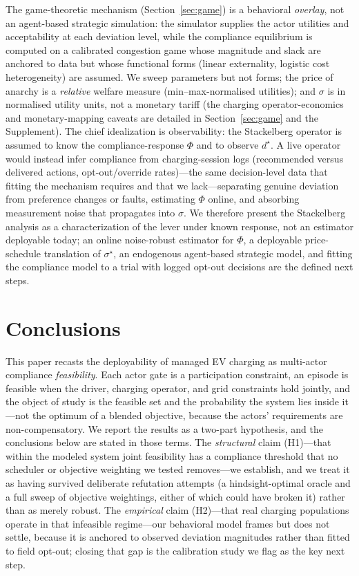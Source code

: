 \documentclass[12pt]{article}
\begin{document}
The game-theoretic mechanism (Section~\ref{sec:game}) is a behavioral \emph{overlay}, not an agent-based strategic simulation: the simulator supplies the actor utilities and acceptability at each deviation level, while the compliance equilibrium is computed on a calibrated congestion game whose magnitude and slack are anchored to data but whose functional forms (linear externality, logistic cost heterogeneity) are assumed. We sweep parameters but not forms; the price of anarchy is a \emph{relative} welfare measure (min--max-normalised utilities); and $\sigma$ is in normalised utility units, not a monetary tariff (the charging operator-economics and monetary-mapping caveats are detailed in Section~\ref{sec:game} and the Supplement). The chief idealization is observability: the Stackelberg operator is assumed to know the compliance-response $\Phi$ and to observe $d^\star$. A live operator would instead infer compliance from charging-session logs (recommended versus delivered actions, opt-out/override rates)---the same decision-level data that fitting the mechanism requires and that we lack---separating genuine deviation from preference changes or faults, estimating $\Phi$ online, and absorbing measurement noise that propagates into $\sigma$. We therefore present the Stackelberg analysis as a characterization of the lever under known response, not an estimator deployable today; an online noise-robust estimator for $\Phi$, a deployable price-schedule translation of $\sigma^\star$, an endogenous agent-based strategic model, and fitting the compliance model to a trial with logged opt-out decisions are the defined next steps.

\section{Conclusions}\label{sec:conclusions}

This paper recasts the deployability of managed EV charging as multi-actor compliance \emph{feasibility}. Each actor gate is a participation constraint, an episode is feasible when the driver, charging operator, and grid constraints hold jointly, and the object of study is the feasible set and the probability the system lies inside it---not the optimum of a blended objective, because the actors' requirements are non-compensatory. We report the results as a two-part hypothesis, and the conclusions below are stated in those terms. The \emph{structural} claim (H1)---that within the modeled system joint feasibility has a compliance threshold that no scheduler or objective weighting we tested removes---we establish, and we treat it as having survived deliberate refutation attempts (a hindsight-optimal oracle and a full sweep of objective weightings, either of which could have broken it) rather than as merely robust. The \emph{empirical} claim (H2)---that real charging populations operate in that infeasible regime---our behavioral model frames but does not settle, because it is anchored to observed deviation magnitudes rather than fitted to field opt-out; closing that gap is the calibration study we flag as the key next step.
\end{document}
